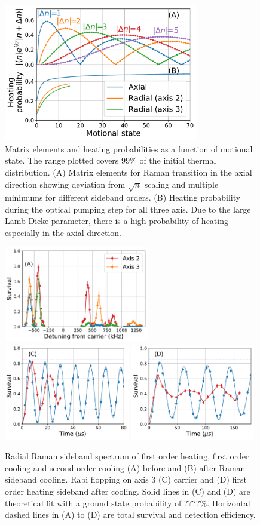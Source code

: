 \documentclass[aps,prl,twocolumn,groupedaddress]{revtex4-1}
\begin{document}
\begin{figure}[b]
  \includegraphics[width=8.5cm]{imgs/fig2_raman_op.pdf}
  \caption{Matrix elements and heating probabilities as a function of motional state.
    The range plotted covers $99\%$ of the initial thermal distribution.
    (A) Matrix elements for Raman transition in the axial direction showing deviation from
    $\sqrt{n}$ scaling and multiple minimums for different sideband orders.
    (B) Heating probability during the optical pumping step for all three axis.
    Due to the large Lamb-Dicke parameter,
    there is a high probability of heating especially in the axial direction.
    \label{f-ld}}
\end{figure}
\begin{figure}
  \includegraphics[height=4.2cm]{imgs/spectrum_r.pdf}
  \includegraphics[height=4.2cm]{imgs/rabi_flop_r3_0.pdf}
  \includegraphics[height=4.2cm]{imgs/rabi_flop_r3_p1.pdf}
  \caption{Radial Raman sideband spectrum of first order heating, first order cooling and
    second order cooling (A) before and (B) after Raman sideband cooling.
    Rabi flopping on axis 3 (C) carrier and (D) first order heating sideband
    after cooling.
    Solid lines in (C) and (D) are theoretical fit with a ground state probability of $????\%$.
    Horizontal dashed lines in (A) to (D) are total survival and detection efficiency.
    \label{f-radial}}
\end{figure}
\end{document}

